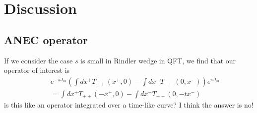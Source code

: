 \documentclass[a4paper,11pt]{article}
\theoremstyle{definition}
\newcommand{\nn}{\nonumber}
\newcommand{\lb}{\left(}
\newcommand{\rb}{\right)}
\newcommand{\mO}{\mathcal{O}}
\newcommand{\NL}[1]{\textcolor{blue}{#1}}
\newcommand{\p}{\partial}
\begin{document}


\section{Discussion}



\subsection{ANEC operator}
If we consider the case $s$ is small in Rindler wedge in QFT, we find that our operator of interest is 
\begin{eqnarray}
    &&e^{-\pi J_{01}}\lb  \int dx^+ T_{++}(x^+,0)-\int dx^- T_{--}(0,x^-)\rb e^{\pi J_{01}}\nn\\\
    &&=\int dx^+ T_{++}(-x^+,0)-\int dx^- T_{--}(0,-tx^-)
\end{eqnarray}
is this like an operator integrated over a time-like curve? I think the answer is no!
\end{document}
